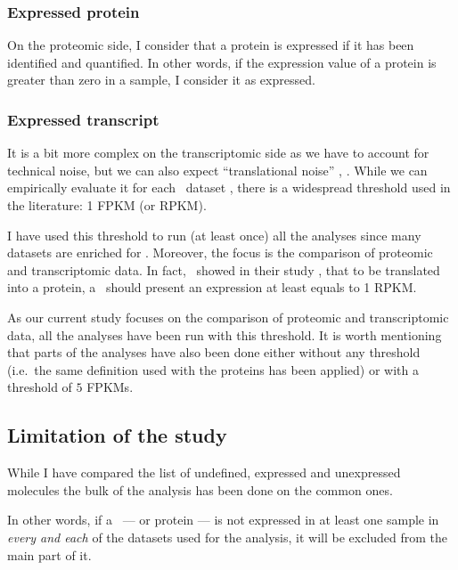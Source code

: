 \subsubsection{Expressed protein}
On the proteomic side, I consider that a protein is expressed if it has been
identified and quantified. In other words, if the expression value of a protein
is greater than zero in a sample, I consider it as expressed.

\subsubsection{Expressed transcript}\label{subsubsec:exprTrans}
It is a bit more complex on the transcriptomic side as we have to account for
technical noise, but we can also expect ``translational noise'' \citep{rnaseq-2009},
\citep{lowNoiseLimit}.
While we can empirically evaluate it for each \Rnaseq\ dataset \citep{ramskoldan:2009},
there is a widespread threshold used in the literature:
1 \gls{FPKM} (or \gls{RPKM}).

I have used this threshold to run (at least once) all the analyses since
many datasets are enriched for \mRNAs. Moreover, the 
focus is the comparison of proteomic and
transcriptomic data. In fact,~\citet{Hebenstreit:2011} showed in their study
, that to be translated into a protein,
a \mRNA\ should present an expression at least equals to 1 \gls{RPKM}.

As our current study focuses on the comparison of proteomic and transcriptomic
data, all the analyses have been run with this threshold. It is worth mentioning
that parts of the analyses have also been done either without
any threshold (i.e.\ the same definition used with the proteins has been applied)
or with a threshold of $5$ \glspl{FPKM}.

\subsection{Limitation of the study}
While I have compared the list of undefined, expressed and unexpressed molecules
the bulk of the analysis has been done on the common ones.

In other words, if a \mRNA\ --- or protein --- is not expressed in at least
one sample in \emph{every and each} of the datasets used for the analysis,
it will be excluded from the main part of it.



